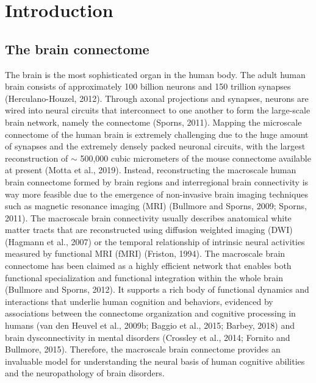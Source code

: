 \pagestyle{MyStyle}

\chapter[Introduction]{Introduction}
\label{ch:intro}

\vspace{3cm}

\begin{refsection}
\newpage
\section*{The brain connectome}
The brain is the most sophisticated organ in the human body. The adult human brain consists of approximately 100 billion neurons and 150 trillion synapses (Herculano-Houzel, 2012). Through axonal projections and synapses, neurons are wired into neural circuits that interconnect to one another to form the large-scale brain network, namely the connectome (Sporns, 2011). Mapping the microscale connectome of the human brain is extremely challenging due to the huge amount of synapses and the extremely densely packed neuronal circuits, with the largest reconstruction of $ \sim $ 500,000 cubic micrometers of the mouse connectome available at present (Motta et al., 2019). Instead, reconstructing the macroscale human brain connectome formed by brain regions and interregional brain connectivity is way more feasible due to the emergence of non-invasive brain imaging techniques such as magnetic resonance imaging (MRI) (Bullmore and Sporns, 2009; Sporns, 2011). The macroscale brain connectivity usually describes anatomical white matter tracts that are reconstructed using diffusion weighted imaging (DWI) (Hagmann et al., 2007) or the temporal relationship of intrinsic neural activities measured by functional MRI (fMRI) (Friston, 1994). The macroscale brain connectome has been claimed as a highly efficient network that enables both functional specialization and functional integration within the whole brain (Bullmore and Sporns, 2012). It supports a rich body of functional dynamics and interactions that underlie human cognition and behaviors, evidenced by associations between the connectome organization and cognitive processing in humans (van den Heuvel et al., 2009b; Baggio et al., 2015; Barbey, 2018) and brain dysconnectivity in mental disorders (Crossley et al., 2014; Fornito and Bullmore, 2015). Therefore, the macroscale brain connectome provides an invaluable model for understanding the neural basis of human cognitive abilities and the neuropathology of brain disorders.


\end{refsection}
